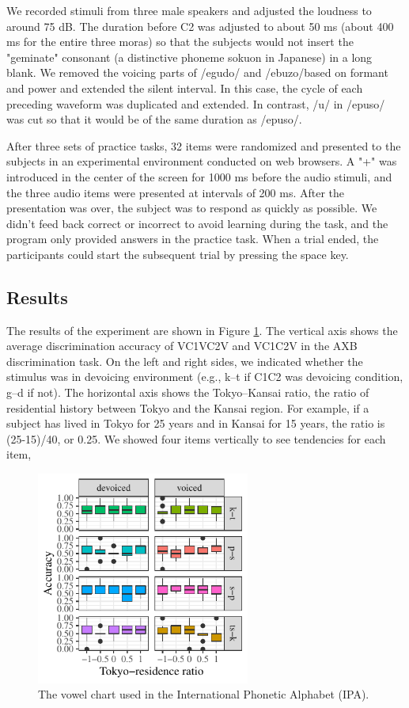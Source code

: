 \documentclass[a4paper,11pt,twocolumn]{article}
\begin{document}
We recorded stimuli from three male speakers and adjusted the loudness to around 75 dB. The duration before C2 was adjusted to about 50 ms (about 400 ms for the entire three moras) so that the subjects would not insert the "geminate" consonant (a distinctive phoneme sokuon in Japanese) in a long blank. We removed the voicing parts of /egudo/ and /ebuzo/based on formant and power and extended the silent interval. In this case, the cycle of each preceding waveform was duplicated and extended. In contrast, /u/ in /epuso/ was cut so that it would be of the same duration as /epuso/.

After three sets of practice tasks, 32 items were randomized and presented to the subjects in an experimental environment conducted on web browsers. A "+" was introduced in the center of the screen for 1000 ms before the audio stimuli, and the three audio items were presented at intervals of 200 ms. After the presentation was over, the subject was to respond as quickly as possible. We didn't feed back correct or incorrect to avoid learning during the task, and the program only provided answers in the practice task. When a trial ended, the participants could start the subsequent trial by pressing the space key.

\subsection{Results}

The results of the experiment are shown in Figure \ref{fig:axb_results}. The vertical axis shows the average discrimination accuracy of VC1VC2V and VC1C2V in the AXB discrimination task. On the left and right sides, we indicated whether the stimulus was in devoicing environment (e.g., k--t if C1C2 was devoicing condition, g--d if not). The horizontal axis shows the Tokyo--Kansai ratio, the ratio of residential history between Tokyo and the Kansai region. For example, if a subject has lived in Tokyo for 25 years and in Kansai for 15 years, the ratio is (25-15)/40, or 0.25. We showed four items vertically to see tendencies for each item,

\begin{figure}[!ht]
\begin{center}
\includegraphics[width=7cm]{../results/artifact/results_axb_allophone.pdf}
\caption{The vowel chart used in the International Phonetic
Alphabet (IPA).}\label{fig:axb_results}
\end{center}
\end{figure}
\end{document}
